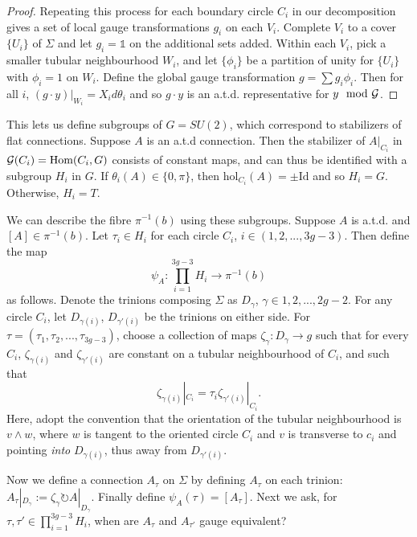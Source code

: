 \begin{proof}
	Repeating this process for each boundary circle $C_i$ in our decomposition gives a set of local gauge transformations $g_i$ on each $V_i$. Complete $V_i$ to a cover $\{U_i\}$ of $\Sigma$ and let $g_i = \mathds{1}$ on the additional sets added. Within each $V_i$, pick a smaller tubular neighbourhood $W_i$, and let $\{\phi_i\}$ be a partition of unity for $\{U_i\}$ with $\phi_i = 1$ on $W_i$. Define the global gauge transformation $g = \sum g_i \phi_i$. Then for all $i$, $(g\cdot y)|_{W_i} = X_i d\theta_i$ and so $g\cdot y$ is an a.t.d. representative for $y \mod {\mathcal{G}}$.
	\end{proof}
	
	This lets us define subgroups of $G=SU(2)$, which correspond to stabilizers of flat connections. Suppose $A$ is an a.t.d connection. Then the stabilizer of $A|_{C_i}$ in $\mathcal{G}(C_i) = \text{Hom}(C_i, G)$ consists of constant maps, and can thus be identified with a subgroup $H_i$ in $G$. If $\theta_i(A) \in \{0,\pi\}$, then $\text{hol}_{C_i}(A) = \pm\text{Id}$ and so $H_i = G$. Otherwise, $H_i = T$. 
	
	We can describe the fibre $\pi^{-1}(b)$ using these subgroups. Suppose $A$ is a.t.d. and $[A] \in \pi^{-1}(b)$. Let $\tau_i \in H_i$ for each circle $C_i$, $i\in (1,2,...,3g-3)$. Then define the map
	\begin{equation}
		\label{e:psiA}
		\psi_A : \prod_{i=1}^{3g-3} H_i \to \pi^{-1}(b)
	\end{equation}
	as follows. Denote the trinions composing $\Sigma$ as $D_{\gamma}$, $\gamma\in{1,2,...,2g-2}$. For any circle $C_i$, let $D_{\gamma(i)}$, $D_{\gamma'(i)}$ be the trinions on either side. For $\tau=(\tau_1,\tau_2,...,\tau_{3g-3})$, choose a collection of maps $\zeta_\gamma : D_\gamma \to g$ such that for every $C_i$, $\zeta_{\gamma(i)}$ and $\zeta_{\gamma'(i)}$ are constant on a tubular neighbourhood of $C_i$, and such that
	\begin{equation}
		\zeta_{\gamma(i)}|_{C_i} = \tau_i \zeta_{\gamma'(i)}|_{C_i}.
	\end{equation}
	Here, adopt the convention that the orientation of the tubular neighbourhood is $v\wedge w$, where $w$ is tangent to the oriented circle $C_i$ and $v$ is transverse to $c_i$ and pointing \textit{into} $D_{\gamma(i)}$, thus away from $D_{\gamma'(i)}$.
	
	Now we define a connection $A_\tau$ on $\Sigma$ by defining $A_\tau$ on each trinion: $A_\tau|_{D_\gamma} := \zeta_\gamma \circlearrowright A|_{D_\gamma}$. Finally define $\psi_A(\tau) = [A_\tau]$. Next we ask, for $\tau,\tau' \in \prod_{i=1}^{3g-3} H_i$, when are $A_\tau$ and $A_{\tau'}$ gauge equivalent? 
	
